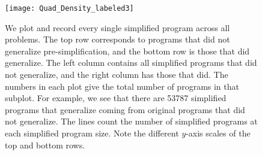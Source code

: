 


\begin{figure}[t] %
\centering
\texttt{[image: Quad\_Density\_labeled3]} %
\caption{We plot and record every single simplified program across all problems. The top row corresponds to programs that did not generalize pre-simplification, and the bottom row is those that did generalize. The left column contains all simplified programs that did not generalize, and the right column has those that did. The numbers in each plot give the total number of programs in that subplot. For example, we see that there are 53787 simplified programs that generalize coming from original programs that did not generalize. The lines count the number of simplified programs at each simplified program size. Note the different $y$-axis scales of the top and bottom rows.}
\label{fig:count:quad}
\end{figure}

%

